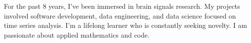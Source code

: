 \begin{cventries}
    \begin{flushleft}
        \bodyfont
    For the past 8 years, I’ve been immersed in brain signals research. My projects
    involved software development, data engineering, and data science focused
    on time series analysis. I'm a lifelong learner who is constantly seeking
    novelty. I am passionate about applied mathematics and code.
    \end{flushleft}
\end{cventries}
